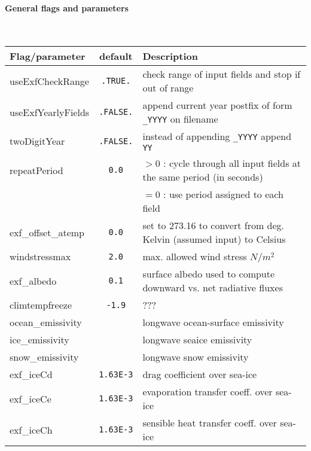\paragraph{General flags and parameters}
~ \\
%
\begin{table}[!ht]
  \centering
  {\footnotesize
    \begin{tabular}{|l|c|l|}
      \hline 
      \textbf{Flag/parameter} & \textbf{default} &  \textbf{Description}  \\
      \hline \hline
        useExfCheckRange & \texttt{.TRUE.} & 
           check range of input fields and stop if out of range \\
        useExfYearlyFields & \texttt{.FALSE.} & 
           append current year postfix of form \texttt{\_YYYY} on filename \\
        twoDigitYear & \texttt{.FALSE.} & 
           instead of appending \texttt{\_YYYY} append  \texttt{YY} \\
        repeatPeriod & \texttt{0.0} & $ > 0 $ : 
           cycle through all input fields at the same period (in seconds) \\
        ~            & ~            & $ = 0 $ :
           use period assigned to each field \\
        exf\_offset\_atemp & \texttt{0.0} & set to 273.16 to convert from deg. Kelvin (assumed input) to Celsius \\
        windstressmax & \texttt{2.0} & 
           max. allowed wind stress $N/m^2$ \\
        exf\_albedo & \texttt{0.1} & 
          surface albedo used to compute downward vs. net radiative fluxes \\
        climtempfreeze & \texttt{-1.9} & 
          ??? \\
        ocean\_emissivity & \texttt{} & 
          longwave ocean-surface emissivity \\
        ice\_emissivity & \texttt{} & 
          longwave seaice emissivity \\
        snow\_emissivity & \texttt{} & 
          longwave  snow  emissivity \\
        exf\_iceCd & \texttt{1.63E-3} & 
          drag coefficient over sea-ice \\
        exf\_iceCe & \texttt{1.63E-3} & 
          evaporation transfer coeff. over sea-ice \\
        exf\_iceCh & \texttt{1.63E-3} & 
          sensible heat transfer coeff. over sea-ice \\

\end{tabular}}
\end{table}

